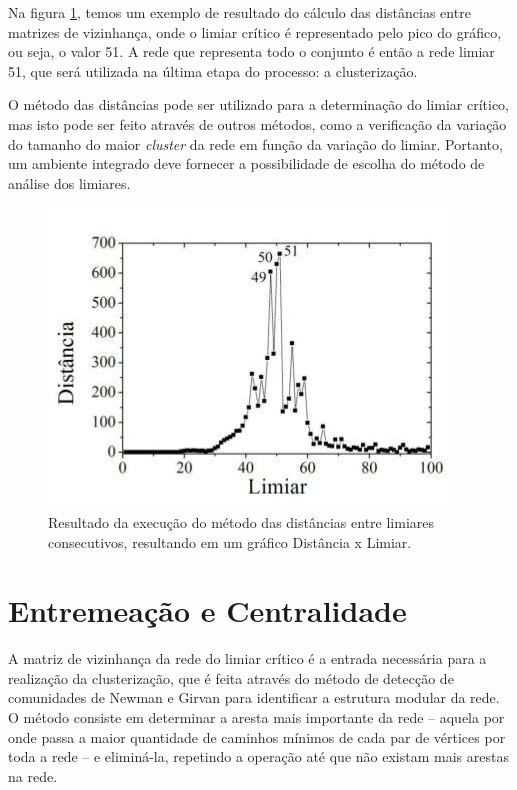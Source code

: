 Na figura \ref{fig:distancia}, temos um exemplo de resultado do cálculo das distâncias entre matrizes de vizinhança, onde o limiar crítico é representado
pelo pico do gráfico, ou seja, o valor 51. A rede que representa todo o conjunto é então a rede limiar 51, que será utilizada na última etapa do processo:
a clusterização.

O método das distâncias pode ser utilizado para a determinação do limiar crítico, mas isto pode ser feito através de outros métodos, como a verificação da
variação do tamanho do maior \textit{cluster} da rede em função da variação do limiar. Portanto, um ambiente integrado deve fornecer a possibilidade de
escolha do método de análise dos limiares.

\begin{figure}
\centering
\includegraphics[scale=0.58]{distancia}
\caption{Resultado da execução do método das distâncias entre limiares consecutivos, resultando em um gráfico Distância x Limiar.}
\label{fig:distancia}
\end{figure}

\section{Entremeação e Centralidade} \label{sec:entremeacao}

A matriz de vizinhança da rede do limiar crítico é a entrada necessária para a realização da clusterização, que é feita através do método de detecção
de comunidades de Newman e Girvan \cite{newman2004} para identificar a estrutura modular da rede. O método consiste em determinar a aresta mais importante
da rede – aquela por onde passa a maior quantidade de caminhos mínimos de cada par de vértices por toda a rede – e eliminá-la, repetindo a operação
até que não existam mais arestas na rede.

